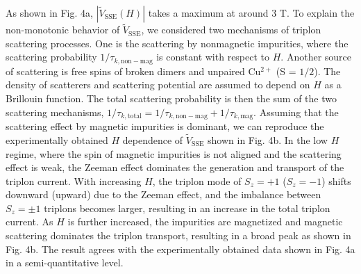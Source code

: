 \documentclass{nature}
\begin{document}
\par 
As shown in Fig. 4a, $|\tilde{V}_{\mathrm{SSE}}(H)|$ takes a maximum at around 3 T. 
To explain the non-monotonic behavior of $\tilde{V}_{\mathrm{SSE}}$, we considered two mechanisms 
of triplon scattering processes. 
One is the scattering by nonmagnetic impurities, where the scattering probability 
$1/\tau_{k,\mathrm{non-mag}}$ is constant with respect to $H$.
Another source of scattering is free spins of broken dimers and unpaired Cu$^{2+}$ (S = $1/2$).
The density of scatterers and scattering potential are assumed to depend on $H$ as a Brillouin function. 
The total scattering probability is then the sum of the two scattering mechanisms, 
$1/\tau_{k,\mathrm{total}} = 1/\tau_{k,\mathrm{non-mag}} + 1/\tau_{k,\mathrm{mag}}$. 
Assuming that the scattering effect by magnetic impurities is dominant, 
we can reproduce the experimentally obtained $H$ dependence of  $\tilde{V}_{\mathrm{SSE}}$ shown in Fig. 4b. 
In the low $H$ regime, where the spin of magnetic impurities is not aligned and the scattering effect is weak, 
the Zeeman effect dominates the generation and transport of the triplon current. 
With increasing $H$, the triplon mode of $S_z = +1$ ($S_z = -1$) shifts downward (upward) due to the Zeeman effect, and the imbalance between $S_z = \pm 1$ triplons becomes larger, resulting in an increase in the total triplon current.
As $H$ is further increased, the impurities are magnetized and magnetic scattering dominates the triplon transport, resulting in a broad peak as shown in Fig. 4b.
The result agrees with the experimentally obtained data shown in Fig. 4a in a semi-quantitative level. 



\par 
\end{document}
